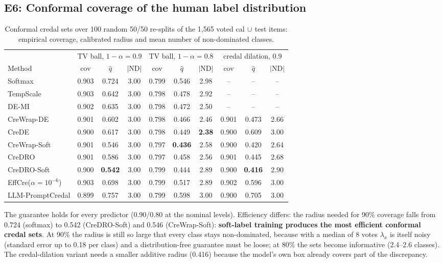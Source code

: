 \documentclass[11pt,a4paper]{article}
\newcommand{\ND}{\mathrm{ND}}
\newcommand{\best}[1]{\textbf{#1}}
\begin{document}
\subsection{E6: Conformal coverage of the human label distribution}

\begin{table}[h]
\centering\small\setlength{\tabcolsep}{4pt}
\begin{tabular}{l ccc ccc ccc}
\toprule
 & \multicolumn{3}{c}{TV ball, $1-\alpha=0.9$} & \multicolumn{3}{c}{TV ball, $1-\alpha=0.8$} & \multicolumn{3}{c}{credal dilation, 0.9} \\
\cmidrule(lr){2-4}\cmidrule(lr){5-7}\cmidrule(lr){8-10}
Method & cov & $\hat q$ & $|\ND|$ & cov & $\hat q$ & $|\ND|$ & cov & $\hat q$ & $|\ND|$ \\
\midrule
Softmax & 0.903 & 0.724 & 3.00 & 0.799 & 0.546 & 2.98 & -- & -- & -- \\
TempScale & 0.903 & 0.642 & 3.00 & 0.798 & 0.478 & 2.92 & -- & -- & -- \\
DE-MI & 0.902 & 0.635 & 3.00 & 0.798 & 0.472 & 2.50 & -- & -- & -- \\
CreWrap-DE & 0.901 & 0.602 & 3.00 & 0.798 & 0.466 & 2.46 & 0.901 & 0.473 & 2.66 \\
CreDE & 0.900 & 0.617 & 3.00 & 0.798 & 0.449 & \best{2.38} & 0.900 & 0.609 & 3.00 \\
CreWrap-Soft & 0.901 & 0.546 & 3.00 & 0.797 & \best{0.436} & 2.58 & 0.900 & 0.420 & 2.64 \\
CreDRO & 0.901 & 0.586 & 3.00 & 0.797 & 0.458 & 2.56 & 0.901 & 0.445 & 2.68 \\
CreDRO-Soft & 0.900 & \best{0.542} & 3.00 & 0.799 & 0.444 & 2.89 & 0.900 & \best{0.416} & 2.90 \\
EffCre($\alpha{=}10^{-6}$) & 0.903 & 0.698 & 3.00 & 0.799 & 0.517 & 2.89 & 0.902 & 0.596 & 3.00 \\
LLM-PromptCredal & 0.899 & 0.757 & 3.00 & 0.799 & 0.598 & 3.00 & 0.900 & 0.705 & 3.00 \\
\bottomrule
\end{tabular}
\caption{Conformal credal sets over 100 random 50/50 re-splits of the 1{,}565 voted cal$\,\cup\,$test items: empirical coverage, calibrated radius and mean number of non-dominated classes.}
\label{tab:e6}
\end{table}

The guarantee holds for every predictor (0.90/0.80 at the nominal levels). Efficiency differs: the radius needed for 90\% coverage falls from 0.724 (softmax) to 0.542 (CreDRO-Soft) and 0.546 (CreWrap-Soft): \textbf{soft-label training produces the most efficient conformal credal sets}. At 90\% the radius is still so large that every class stays non-dominated, because with a median of 8 votes $\lambda_x$ is itself noisy (standard error up to 0.18 per class) and a distribution-free guarantee must be loose; at 80\% the sets become informative (2.4--2.6 classes). The credal-dilation variant needs a smaller additive radius (0.416) because the model's own box already covers part of the discrepancy.
\end{document}
